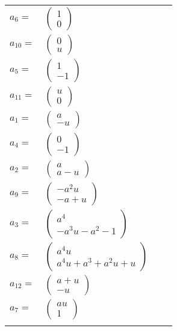 \documentclass[1p]{elsarticle_modified}
\theoremstyle{definition}
\begin{document}
\begin{tabular}{m{7pt} m{180pt} m{7pt} m{180pt} }
\flushright $a_{6}=$&$\begin{pmatrix}1\\0\end{pmatrix}$ \\
\flushright $a_{10}=$&$\begin{pmatrix}0\\u\end{pmatrix}$ \\
\flushright $a_{5}=$&$\begin{pmatrix}1\\-1\end{pmatrix}$ \\
\flushright $a_{11}=$&$\begin{pmatrix}u\\0\end{pmatrix}$ \\
\flushright $a_{1}=$&$\begin{pmatrix}a\\- u\end{pmatrix}$ \\
\flushright $a_{4}=$&$\begin{pmatrix}0\\-1\end{pmatrix}$ \\
\flushright $a_{2}=$&$\begin{pmatrix}a\\a- u\end{pmatrix}$ \\
\flushright $a_{9}=$&$\begin{pmatrix}- a^2 u\\- a+u\end{pmatrix}$ \\
\flushright $a_{3}=$&$\begin{pmatrix}a^4\\- a^3 u- a^2-1\end{pmatrix}$ \\
\flushright $a_{8}=$&$\begin{pmatrix}a^4 u\\a^4 u+a^3+a^2 u+u\end{pmatrix}$ \\
\flushright $a_{12}=$&$\begin{pmatrix}a+u\\- u\end{pmatrix}$ \\
\flushright $a_{7}=$&$\begin{pmatrix}a u\\1\end{pmatrix}$\\&\end{tabular}
\end{document}
